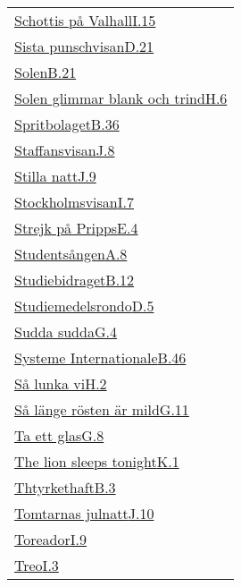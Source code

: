 \begin{longtable}[h]{@{}p{\linewidth}@{}}
  \hyperref[schottispavalhall]{Schottis på Valhall}\dotfill\hyperref[schottispavalhall]{I.15}\\
  \hyperref[sistapunschvisan]{Sista punschvisan}\dotfill\hyperref[sistapunschvisan]{D.21}\\
  \hyperref[solen]{Solen}\dotfill\hyperref[solen]{B.21}\\
  \hyperref[solenglimmar]{Solen glimmar blank och trind}\dotfill\hyperref[solenglimmar]{H.6}\\
  \hyperref[spritbolaget]{Spritbolaget}\dotfill\hyperref[spritbolaget]{B.36}\\
  \hyperref[staffansvisan]{Staffansvisan}\dotfill\hyperref[staffansvisan]{J.8}\\
  \hyperref[sillanatt]{Stilla natt}\dotfill\hyperref[sillanatt]{J.9}\\
  \hyperref[stockholmsvisan]{Stockholmsvisan}\dotfill\hyperref[stockholmsvisan]{I.7}\\
  \hyperref[strejkpapripps]{Strejk på Pripps}\dotfill\hyperref[strejkpapripps]{E.4}\\
  \hyperref[studentsangen]{Studentsången}\dotfill\hyperref[studentsangen]{A.8}\\
  \hyperref[studiebidrag]{Studiebidraget}\dotfill\hyperref[studiebidrag]{B.12}\\
  \hyperref[studiemedelsrondo]{Studiemedelsrondo}\dotfill\hyperref[studiemedelsrondo]{D.5}\\
  \hyperref[suddasudda]{Sudda sudda}\dotfill\hyperref[suddasudda]{G.4}\\
  \hyperref[systemeinternationale]{Systeme Internationale}\dotfill\hyperref[systemeinternationale]{B.46}\\
  \hyperref[fredmanssangno21]{Så lunka vi}\dotfill\hyperref[fredmanssangno21]{H.2}\\
  \hyperref[salangerosten]{Så länge rösten är mild}\dotfill\hyperref[salangerosten]{G.11}\\
  \hyperref[taettglas]{Ta ett glas}\dotfill\hyperref[taettglas]{G.8}\\
  \hyperref[thelion]{The lion sleeps tonight}\dotfill\hyperref[thelion]{K.1}\\
  \hyperref[thtyrkethaft]{Thtyrkethaft}\dotfill\hyperref[thtyrkethaft]{B.3}\\
  \hyperref[tomtarnasjulnatt]{Tomtarnas julnatt}\dotfill\hyperref[tomtarnasjulnatt]{J.10}\\
  \hyperref[toreador]{Toreador}\dotfill\hyperref[toreador]{I.9}\\
  \hyperref[treo]{Treo}\dotfill\hyperref[treo]{I.3}\\

\end{longtable}
